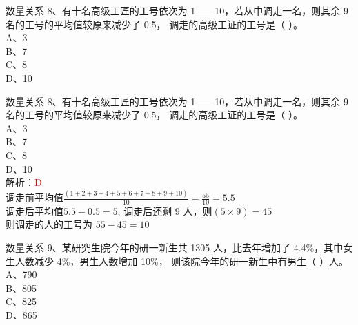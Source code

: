 \documentclass[aspectratio=169]{beamer}
\begin{document}
\begin{frame}[t]{数量关系}
8、有十名高级工匠的工号依次为 1——10，若从中调走一名，则其余 9 名的工号的平均值较原来减少了 0.5，
调走的高级工证的工号是（ ）。\\
A、3\\
B、7\\
C、8\\
D、10\\
\end{frame}



\begin{frame}[t]{数量关系}
8、有十名高级工匠的工号依次为 1——10，若从中调走一名，则其余 9 名的工号的平均值较原来减少了 0.5，
调走的高级工证的工号是（ ）。\\
A、3\\
B、7\\
C、8\\
D、10\\
    解析：\textcolor{red}{D}\\
    调走前平均值$\frac{(1+2+3+4+5+6+7+8+9+10)}{10} = \frac{55}{10} = 5.5$\\
    调走后平均值$5.5 - 0.5 = 5$, 调走后还剩 9 人，则$(5\times9) = 45$\\
    则调走的人的工号为 $55-45=10$\\
\end{frame}


\begin{frame}[t]{数量关系}
    9、某研究生院今年的研一新生共 1305 人，比去年增加了 4.4\%，其中女生人数减少 4\%，男生人数增加 10\%，
则该院今年的研一新生中有男生（ ）人。\\
A、790\\
B、805\\
C、825\\
D、865\\
\end{frame}
\end{document}

